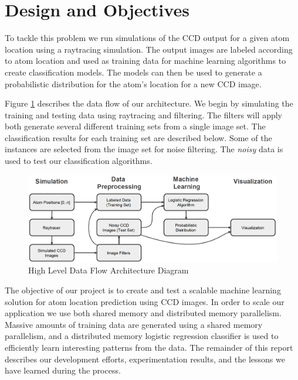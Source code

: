 \section{Design and Objectives}
\label{design}

To tackle this problem we run simulations of the CCD output for a given atom location using a raytracing simulation.  The output images are labeled according to atom location and used as training data for machine learning algorithms to create classification models.  The models can then be used to generate a probabilistic distribution for the atom's location for a new CCD image.  

Figure \ref{fig:arch} describes the data flow of our architecture.  We begin by simulating the training and testing data using raytracing and filtering.  The filters will apply both generate several different training sets from a single image set.  The classification results for each training set are described below.  Some of the instances are selected from the image set for noise filtering.  The \emph{noisy} data is used to test our classification algorithms.

\begin{figure}[h]
\begin{center}
\includegraphics[scale=0.4]{arch.png}
\caption{High Level Data Flow Architecture Diagram}
\label{fig:arch}
\end{center}
\end{figure}

The objective of our project is to create and test a scalable machine learning solution for atom location prediction using CCD images.  In order to scale our application we use both shared memory and distributed memory parallelism.  Massive amounts of training data are generated using a shared memory parallelism, and a distributed memory logistic regression classifier is used to efficiently learn interesting patterns from the data.  The remainder of this report describes our development efforts, experimentation results, and the lessons we have learned during the process.